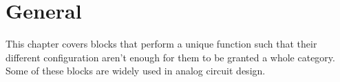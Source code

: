 \chapter{General}

This chapter covers blocks that perform a unique function such that
their different configuration aren't enough for them to be granted a
whole category. Some of these blocks are widely used in analog
circuit design.



